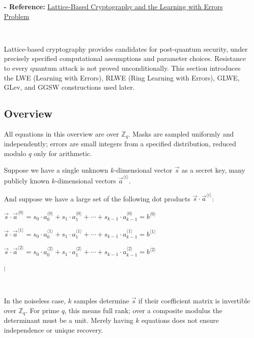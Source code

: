 \textbf{- Reference:} 
\href{https://mysite.science.uottawa.ca/mnevins/papers/StephenHarrigan2017LWE.pdf}{Lattice-Based Cryptography and the Learning with
Errors Problem}~\cite{lattice-crypto}


$ $

Lattice-based cryptography provides candidates for post-quantum security, under precisely specified computational assumptions and parameter choices. Resistance to every quantum attack is not proved unconditionally. This section introduces the LWE (Learning with Errors), RLWE (Ring Learning with Errors), GLWE, GLev, and GGSW constructions used later.





\subsection{Overview}
\label{subsec:lattice-overview}

All equations in this overview are over $\mathbb Z_q$. Masks are sampled uniformly and independently; errors are small integers from a specified distribution, reduced modulo $q$ only for arithmetic.

Suppose we have a single unknown $k$-dimensional vector $\vec{s}$ as a secret key, many publicly known $k$-dimensional vectors $\vec{a}^{\langle i \rangle}$.

And suppose we have a large set of the following dot products $\vec{s} \cdot \vec{a}^{\langle i \rangle}$: 

$\vec{s} \cdot \vec{a}^{\langle 0 \rangle} = s_0\cdot a_{0}^{\langle 0 \rangle} + s_1\cdot a_{1}^{\langle 0 \rangle} + \cdots + s_{k-1}\cdot a_{k-1}^{\langle 0 \rangle} = b^{\langle 0 \rangle}$

$\vec{s} \cdot \vec{a}^{\langle 1 \rangle} = s_0\cdot a_{0}^{\langle 1 \rangle} + s_1\cdot a_{1}^{\langle 1 \rangle} + \cdots + s_{k-1}\cdot a_{k-1}^{\langle 1 \rangle} = b^{\langle 1 \rangle}$

$\vec{s} \cdot \vec{a}^{\langle 2 \rangle} = s_0\cdot a_{0}^{\langle 2 \rangle} + s_1\cdot a_{1}^{\langle 2 \rangle} + \cdots + s_{k-1}\cdot a_{k-1}^{\langle 2 \rangle} = b^{\langle 2 \rangle}$

\text{ } $\vdots$

$ $

In the noiseless case, $k$ samples determine $\vec s$ if their coefficient matrix is invertible over $\mathbb Z_q$. For prime $q$, this means full rank; over a composite modulus the determinant must be a unit. Merely having $k$ equations does not ensure independence or unique recovery.

